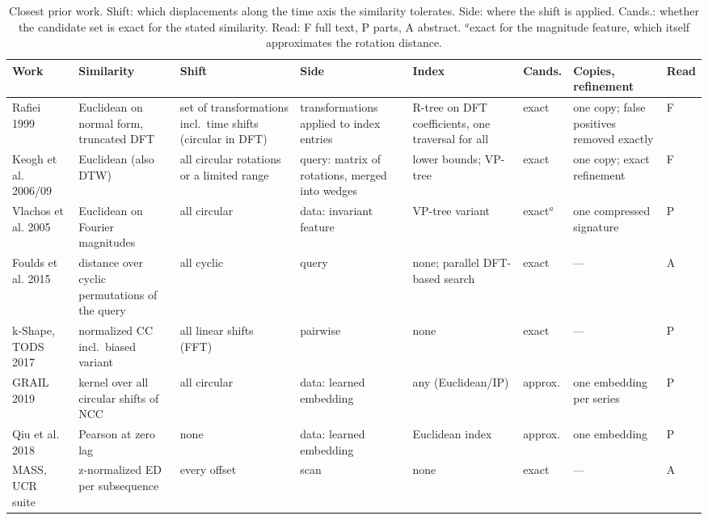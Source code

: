 \documentclass[sigconf]{acmart}
\begin{document}
\begin{table}[t]
\caption{Closest prior work. Shift: which displacements along the time axis the similarity tolerates. Side: where the shift is applied. Cands.: whether the candidate set is exact for the stated similarity. Read: F full text, P parts, A abstract. $^a$exact for the magnitude feature, which itself approximates the rotation distance.}
\label{tab:related}
\footnotesize\setlength{\tabcolsep}{3pt}
\begin{tabularx}{\textwidth}{@{}>{\raggedright\arraybackslash}p{}>{\raggedright\arraybackslash}p{}>{\raggedright\arraybackslash}p{}>{\raggedright\arraybackslash}p{}>{\raggedright\arraybackslash}p{}>{\raggedright\arraybackslash}p{}>{\raggedright\arraybackslash}X>{\centering\arraybackslash}p{}@{}}
\toprule
Work & Similarity & Shift & Side & Index & Cands. & Copies, refinement & Read \\
\midrule
Rafiei 1999~\cite{rafiei} & Euclidean on normal form, truncated DFT & set of transformations incl.\ time shifts (circular in DFT) & transformations applied to index entries & R-tree on DFT coefficients, one traversal for all & exact & one copy; false positives removed exactly & F \\
Keogh et al. 2006/09~\cite{keogh} & Euclidean (also DTW) & all circular rotations or a limited range & query: matrix of rotations, merged into wedges & lower bounds; VP-tree & exact & one copy; exact refinement & F \\
Vlachos et al. 2005~\cite{vlachos} & Euclidean on Fourier magnitudes & all circular & data: invariant feature & VP-tree variant & exact$^a$ & one compressed signature & P \\
Foulds et al. 2015~\cite{foulds} & distance over cyclic permutations of the query & all cyclic & query & none; parallel DFT-based search & exact & --- & A \\
k-Shape, TODS 2017~\cite{kshape,kshapetods} & normalized CC incl.\ biased variant & all linear shifts (FFT) & pairwise & none & exact & --- & P \\
GRAIL 2019~\cite{grail} & kernel over all circular shifts of NCC & all circular & data: learned embedding & any (Euclidean/IP) & approx. & one embedding per series & P \\
Qiu et al. 2018~\cite{qiu} & Pearson at zero lag & none & data: learned embedding & Euclidean index & approx. & one embedding & P \\
MASS, UCR suite~\cite{mass,ucr} & z-normalized ED per subsequence & every offset & scan & none & exact & --- & A \\

\end{tabularx}
\end{table}
\end{document}
